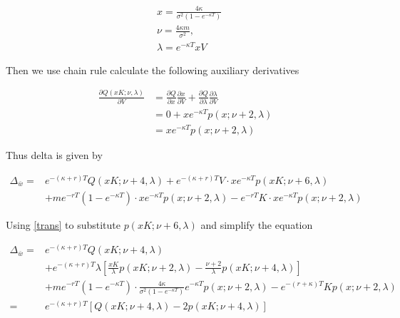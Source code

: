 \begin{equation}
    \begin{aligned}
        &x=\frac{4 \kappa}{\sigma^{2}(1-e^{-\kappa T})} \\
        &\nu=\frac{4 \kappa m}{\sigma^{2}}, \\
        &\lambda= e^{-\kappa T}x V
    \end{aligned}
\end{equation}

\noindent Then we use chain rule calculate the following auxiliary derivatives

\begin{equation}
    \begin{aligned}
        \frac{\partial Q(xK; \nu, \lambda)}{\partial V}&= \frac{\partial Q}{\partial x}\frac{\partial x}{\partial V} + \frac{\partial Q}{\partial \lambda} \frac{\partial \lambda}{\partial V} \\
        &=0 + x e^{-\kappa T} p(x ; \nu+2, \lambda)\\
        &= x e^{-\kappa T} p(x ; \nu+2, \lambda)
    \end{aligned}
\end{equation}

\noindent Thus delta is given by

\begin{equation}
    \begin{aligned}
        \Delta_{\bar{w}}=&  e^{ -(\kappa+r) T} Q(x K ; \nu+4, \lambda) + e^{ -(\kappa+r) T}V \cdot x e^{-\kappa T} p(x K ; \nu+6, \lambda)\\
        &+ m e^{-r T}(1-e^{-\kappa T}) \cdot x e^{-\kappa T} p(x ; \nu+2, \lambda) -e^{-r T} K \cdot x e^{-\kappa T} p(x ; \nu+2, \lambda)
        \end{aligned}
\end{equation}

\noindent Using \eqref{trans} to substitute $p(xK;\nu+6,\lambda)$ and simplify the equation

\begin{equation}
    \begin{aligned}
        \Delta_{\bar{w}}=&  e^{ -(\kappa+r) T} Q(x K ; \nu+4, \lambda) \\
        &+ e^{ -(\kappa+r) T} \lambda \left[\frac{xK}{\lambda} p(xK ; \nu+2, \lambda)-\frac{\nu+2}{\lambda} p(xK ; \nu+4, \lambda)\right]\\
        &+ m e^{-r T}(1-e^{-\kappa T}) \cdot \frac{4 \kappa}{\sigma^{2}(1-e^{-\kappa T})} e^{-\kappa T} p(x ; \nu+2, \lambda) -e^{-(r+\kappa) T} K  p(x ; \nu+2, \lambda) \\
        =& e^{ -(\kappa+r) T} [Q(x K ; \nu+4, \lambda)-2p(x K ; \nu+4, \lambda)] 
        \end{aligned}
\end{equation}


